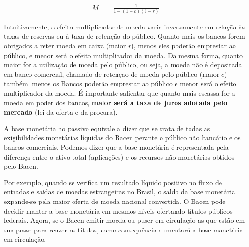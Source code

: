 \documentclass{article}\usepackage[]{graphicx}\usepackage[]{xcolor}
\begin{document}
\begin{equation}\label{eq1}
\begin{split}
    M   &=  \frac{ 1 }{ 1 - ( 1 - c )( 1 - r ) }
\end{split}
\end{equation}

Intuitivamente, o efeito multiplicador de moeda varia inversamente em relação às taxas de reservas ou à 
taxa de retenção do público. Quanto mais os bancos forem obrigados a reter moeda em caixa (maior \(r\)), 
menos eles poderão emprestar ao público, e menor será o efeito multiplicador da moeda. Da mesma forma, 
quanto maior for a utilização de moeda pelo público, ou seja, a moeda não é depositada em banco comercial, 
chamado de retenção de moeda pelo público (maior \(c\)) também, menos os Bancos poderão emprestar ao público 
e menor será o efeito multiplicador da moeda. É importante salientar que quanto mais escassa for a moeda 
em poder dos bancos, \textbf{maior será a taxa de juros adotada pelo mercado} (lei da oferta e da procura).\par

A base monetária no passivo equivale a dizer que se trata de todas as exigibilidades monetárias líquidas 
do Bacen perante o público não bancário e os bancos comerciais. Podemos dizer que a base monetária é 
representada pela diferença entre o ativo total (aplicações) e os recursos não monetários obtidos pelo Bacen.\par

Por exemplo, quando se verifica um resultado líquido positivo no fluxo de entradas e saídas de moedas 
estrangeiras no Brasil, o saldo da base monetária expande-se pela maior oferta de moeda nacional convertida. 
O Bacen pode decidir manter a base monetária em mesmos níveis ofertando títulos públicos federais. Agora, se 
o Bacen emitir moeda ou puser em circulação as que estão em sua posse para reaver os títulos, como 
consequência aumentará a base monetária em circulação.
\end{document}
